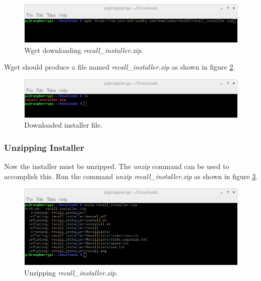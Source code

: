 \documentclass[letterpaper]{article}
\begin{document}
\begin{figure}[H]
  \centering
  \includegraphics[width=14cm]{images/command_line_install/wget_recall_installer.png}
  \caption{Wget downloading \textit{recall\_installer.zip}.}
  \label{fig:wget_recall_installer.zip}
\end{figure}

Wget should produce a file named \textit{recall\_installer.zip} as shown in figure \ref{fig:recall_installer.zip}.

\begin{figure}[H]
  \centering
  \includegraphics[width=14cm]{images/command_line_install/downloaded_zip.png}
  \caption{Downloaded installer file.}
  \label{fig:recall_installer.zip}
\end{figure}
  
\subsubsection{Unzipping Installer}

Now the installer must be unzipped. The \textit{unzip} command can be used to accomplish this. Run the command \textit{unzip recall\_installer.zip} as shown in figure \ref{fig:cammand_line_unzip}.

\begin{figure}[H]
  \centering
  \includegraphics[width=14cm]{images/command_line_install/unzip.png}
  \caption{Unzipping \textit{recall\_installer.zip}.}
  \label{fig:cammand_line_unzip}
\end{figure}
\end{document}
